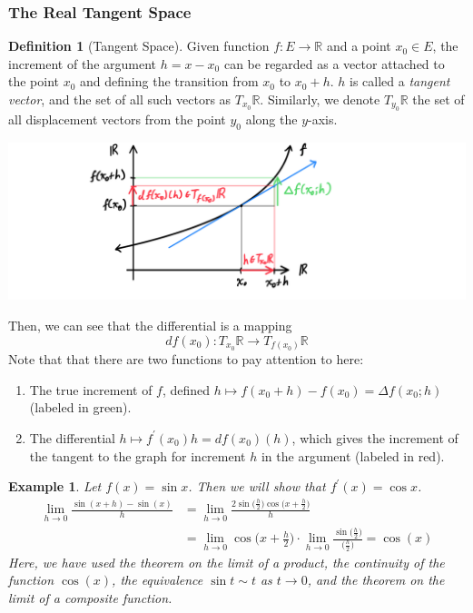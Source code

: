 \documentclass{article}
\newtheorem{example}{Example}[section]
\theoremstyle{remark}
\theoremstyle{definition}
\newtheorem{definition}{Definition}[section]
\begin{document}
\subsubsection{The Real Tangent Space}

\begin{definition}[Tangent Space]
Given function $f: E \longrightarrow \mathbb{R}$ and a point $x_0 \in E$, the increment of the argument $h = x - x_0$ can be regarded as a vector attached to the point $x_0$ and defining the transition from $x_0$ to $x_0 + h$. $h$ is called a \textit{tangent vector}, and the set of all such vectors as $T_{x_0} \mathbb{R}$. Similarly, we denote $T_{y_0} \mathbb{R}$ the set of all displacement vectors from the point $y_0$ along the $y$-axis. 
\begin{center}
    \includegraphics[scale=0.3]{img/Tangent_Space_1_dimensional_in_R.PNG}
\end{center}
Then, we can see that the differential is a mapping
\[df(x_0): T_{x_0} \mathbb{R} \longrightarrow T_{f(x_0)} \mathbb{R}\]
Note that that there are two functions to pay attention to here: 
\begin{enumerate}
    \item The true increment of $f$, defined $h \mapsto f(x_0 + h) - f(x_0) = \Delta f(x_0; h)$ (labeled in green). 
    \item The differential $h \mapsto f^\prime (x_0) h = df(x_0) (h)$, which gives the increment of the tangent to the graph for increment $h$ in the argument (labeled in red). 
\end{enumerate}
\end{definition}

\begin{example}
Let $f(x) = \sin{x}$. Then we will show that $f^\prime (x) = \cos{x}$. 
\begin{align*}
    \lim_{h \rightarrow 0} \frac{\sin{(x+h)} - \sin(x)}{h} & = \lim_{h \rightarrow 0} \frac{2 \sin \big( \frac{h}{2} \big) \cos \big( x + \frac{h}{2} \big)}{h} \\
    & = \lim_{h \rightarrow 0} \cos \Big( x + \frac{h}{2} \Big) \cdot \lim_{h\rightarrow 0} \frac{\sin\big( \frac{h}{2}\big)}{\big(\frac{h}{2}\big)} = \cos(x)
\end{align*}
Here, we have used the theorem on the limit of a product, the continuity of the function $\cos(x)$, the equivalence $\sin{t} \sim t$ as $t \rightarrow 0$, and the theorem on the limit of a composite function. 
\end{example}
\end{document}
